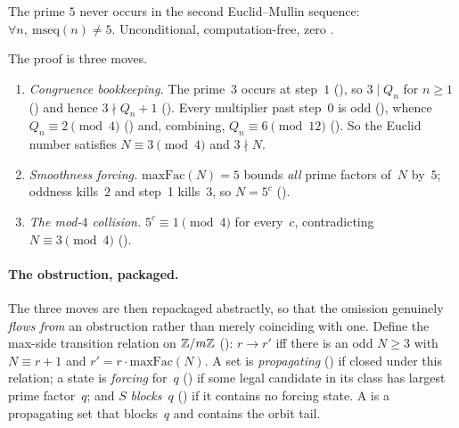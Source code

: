 \begin{keyresult}
\begin{theorem}
\label{thm:five-not-mem}
The prime $5$ never occurs in the second Euclid--Mullin sequence:
$\forall n,\ \mathrm{mseq}(n) \neq 5$.  Unconditional, computation-free,
zero .
\end{theorem}
\end{keyresult}

\noindent The proof is three moves.

\begin{enumerate}[nosep]
\item \emph{Congruence bookkeeping.}  The prime~$3$ occurs at step~$1$
  (), so
  $3 \mid Q_n$ for $n \geq 1$
  () and hence
  $3 \nmid Q_n + 1$
  ().
  Every multiplier past step~$0$ is odd
  (), whence
  $Q_n \equiv 2 \pmod 4$
  () and, combining,
  $Q_n \equiv 6 \pmod{12}$
  ().
  So the Euclid number satisfies $N \equiv 3 \pmod 4$ and $3 \nmid N$.
\item \emph{Smoothness forcing.}  $\mathrm{maxFac}(N) = 5$ bounds
  \emph{all} prime factors of~$N$ by~$5$; oddness kills~$2$ and step~1
  kills~$3$, so $N = 5^c$
  ().
\item \emph{The mod-$4$ collision.}  $5^c \equiv 1 \pmod 4$ for
  every~$c$, contradicting $N \equiv 3 \pmod 4$
  ().
\end{enumerate}

\paragraph{The obstruction, packaged.}
The three moves are then repackaged abstractly, so that the omission
genuinely \emph{flows from} an obstruction rather than merely
coinciding with one.  Define the max-side transition relation on
$\mathbb{Z}/m\mathbb{Z}$
():
$r \to r'$ iff there is an odd $N \geq 3$ with
$N \equiv r+1$ and $r' = r \cdot \mathrm{maxFac}(N)$.
A set is \emph{propagating}
() if closed under
this relation; a state is \emph{forcing} for~$q$
() if some legal
candidate in its class has largest prime factor~$q$; and $S$
\emph{blocks}~$q$
() if it contains no
forcing state.  A
 is a propagating
set that blocks~$q$ and contains the orbit tail.

